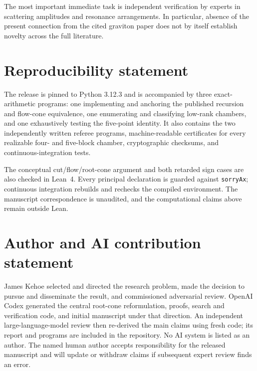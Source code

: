 \documentclass[11pt]{article}
\theoremstyle{definition}
\theoremstyle{remark}
\begin{document}
The most important immediate task is independent verification by experts in
scattering amplitudes and resonance arrangements.  In particular, absence of
the present connection from the cited graviton paper does not by itself
establish novelty across the full literature.

\section*{Reproducibility statement}

The release is pinned to Python 3.12.3 and is accompanied by three
exact-arithmetic programs: one implementing and anchoring the published
recursion and flow-cone equivalence, one enumerating and classifying low-rank
chambers, and one exhaustively testing the five-point identity.  It also
contains the two independently written referee programs, machine-readable
certificates for every realizable four- and five-block chamber, cryptographic
checksums, and continuous-integration tests.

The conceptual cut/flow/root-cone argument and both retarded sign cases are
also checked in Lean~4.  Every principal declaration is guarded against
\texttt{sorryAx}; continuous integration rebuilds and rechecks the compiled
environment.  The manuscript correspondence is unaudited, and the
computational claims above remain outside Lean.

\section*{Author and AI contribution statement}

James Kehoe selected and directed the research problem, made the decision to
pursue and disseminate the result, and commissioned adversarial review.
OpenAI Codex generated the central root-cone reformulation, proofs, search and
verification code, and initial manuscript under that direction.  An independent
large-language-model review then re-derived the main claims using fresh code;
its report and programs are included in the repository.  No AI system is listed
as an author.  The named human author accepts responsibility for the released
manuscript and will update or withdraw claims if subsequent expert review finds
an error.
\end{document}
